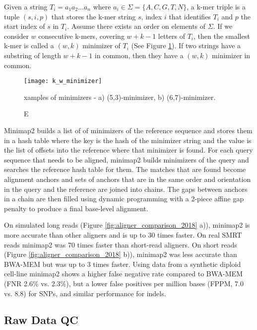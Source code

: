 Given a string $T_i=a_1a_2...a_n$ where $a_i \in \Sigma = \{A,C,G,T,N\}$, a k-mer triple is a tuple $(s,i,p)$ that stores the k-mer string $s$, index $i$ that identifies $T_i$ and $p$ the start index of $s$ in $T_i$. Assume there exists an order on elements of $\Sigma$. If we consider $w$ consecutive k-mers, covering $w+k-1$ letters of $T_i$, then the smallest k-mer is called a $(w,k)$ minimizer of $T_i$ (See Figure \ref{fig:k_w_minimizer}). If two strings have a substring of length $w+k-1$ in common, then they have a $(w,k)$ minimizer in common.

\begin{figure}[h!]
    \texttt{[image: k\_w\_minimizer]}
    \caption Examples of minimizers - a) (5,3)-minimizer, b) (6,7)-minimizer.\autocite{roberts2004reducing}
    \label{fig:k_w_minimizer}
\end{figure}

Minimap2 builds a list of of minimizers of the reference sequence and stores them in a hash table where the key is the hash of the minimizer string and the value is the list of offsets into the reference where that minimizer is found. For each query sequence that needs to be aligned, minimap2 builds minimizers of the query and searches the reference hash table for them. The matches that are found become alignment anchors and sets of anchors that are in the same order and orientation in the query and the reference are joined into chains. The gaps between anchors in a chain are then filled using dynamic programming with a 2-piece affine gap penalty to produce a final base-level alignment.

On simulated long reads (Figure \ref{fig:aligner_comparison_2018} a)), minimap2 is more accurate than other aligners and is up to 30 times faster. On real SMRT reads minimap2 was 70 times faster than short-read aligners. On short reads (Figure \ref{fig:aligner_comparison_2018} b)), minimap2 was less accurate than BWA-MEM but was up to 3 times faster. Using data from a synthetic diploid cell-line\autocite{li2018synthetic} minimap2 shows a higher false negative rate compared to BWA-MEM (FNR 2.6\% vs. 2.3\%), but a lower false positives per million bases (FPPM, 7.0 vs. 8.8) for SNPs, and similar performance for indels.

\subsection{Raw Data QC} 
\label{sec:bg_raw_data_qc}

